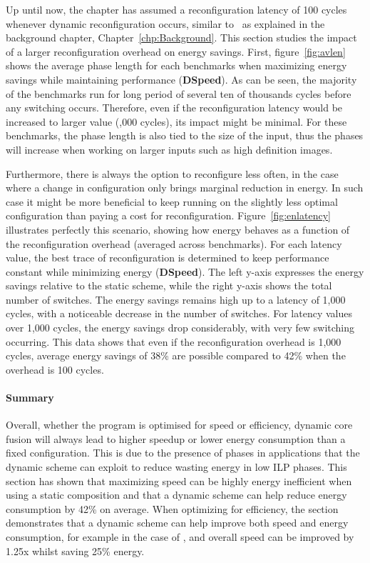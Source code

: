 Up until now, the chapter has assumed a reconfiguration latency of 100 cycles whenever dynamic reconfiguration occurs, similar to~\cite{pricopi2012bahurupi} as explained in the background chapter, Chapter~\ref{chp:Background}.
This section studies the impact of a larger reconfiguration overhead on energy savings.
First, figure~\ref{fig:avlen} shows the average phase length for each benchmarks when maximizing energy savings while maintaining performance (\textbf{DSpeed}).
As can be seen, the majority of the benchmarks run for long period of several ten of thousands cycles before any switching occurs.
Therefore, even if the reconfiguration latency would be increased to larger value (,000 cycles), its impact might be minimal.
For these benchmarks, the phase length is also tied to the size of the input, thus the phases will increase when working on larger inputs such as high definition images.

Furthermore, there is always the option to reconfigure less often, in the case where a change in configuration only brings marginal reduction in energy.
In such case it might be more beneficial to keep running on the slightly less optimal configuration than paying a cost for reconfiguration.
Figure~\ref{fig:enlatency} illustrates perfectly this scenario, showing how energy behaves as a function of the reconfiguration overhead (averaged across benchmarks).
For each latency value, the best trace of reconfiguration is determined to keep performance constant while minimizing energy (\textbf{DSpeed}).
The left y-axis expresses the energy savings relative to the static scheme, while the right y-axis shows the total number of switches.
The energy savings remains high up to a latency of 1,000 cycles, with a noticeable decrease in the number of switches.
For latency values over 1,000 cycles, the energy savings drop considerably, with very few switching occurring.
This data shows that even if the reconfiguration overhead is 1,000 cycles, average energy savings of 38\% are possible compared to 42\% when the overhead is 100 cycles.

\paragraph*{Summary}

Overall, whether the program is optimised for speed or efficiency, dynamic core fusion will always lead to higher speedup or lower energy consumption than a fixed configuration.
This is due to the presence of phases in applications that the dynamic scheme can exploit to reduce wasting energy in low ILP phases.
This section has shown that maximizing speed can be highly energy inefficient when using a static composition and that a dynamic scheme can help reduce energy consumption by 42\% on average.
When optimizing for efficiency, the section demonstrates that a dynamic scheme can help improve both speed and energy consumption, for example in the case of , and overall speed can be improved by 1.25x whilst saving 25\% energy.

